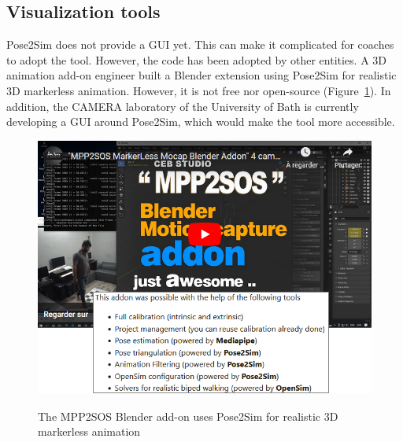 \subsection{Visualization tools}\label{subsec:viztools}

Pose2Sim does not provide a GUI yet. This can make it complicated for coaches to adopt the tool. However, the code has been adopted by other entities. A 3D animation add-on engineer built a Blender \cite{Blender1998} extension using Pose2Sim for realistic 3D markerless animation. However, it is not free nor open-source \cite{Barreto2022} (Figure~\ref{fig_mpp2sos}). In addition, the CAMERA laboratory of the University of Bath is currently developing a GUI around Pose2Sim, which would make the tool more accessible. 

\begin{figure}[hbtp]
      \centering
      \def\svgwidth{1\columnwidth}
      \fontsize{10pt}{10pt}\selectfont
      \href{https://blendermarket.com/products/mocap-mpp2soss}{
            \includegraphics[width=\linewidth]{"../Chap3/Figures/Fig_MPP2SOS.png"}
      }
      \caption{The MPP2SOS Blender add-on uses Pose2Sim for realistic 3D markerless animation}
      \label{fig_mpp2sos}
\end{figure}


